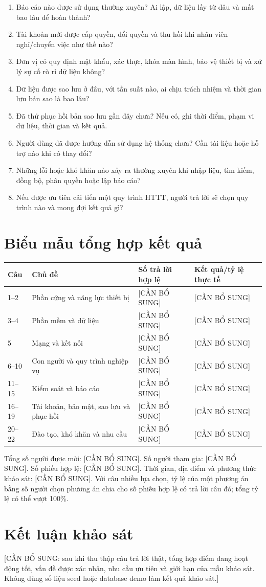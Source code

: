 \begin{enumerate}
\item Báo cáo nào được sử dụng thường xuyên? Ai lập, dữ liệu lấy từ đâu và mất bao lâu để hoàn thành?
\item Tài khoản mới được cấp quyền, đổi quyền và thu hồi khi nhân viên nghỉ/chuyển việc như thế nào?
\item Đơn vị có quy định mật khẩu, xác thực, khóa màn hình, bảo vệ thiết bị và xử lý sự cố rò rỉ dữ liệu không?
\item Dữ liệu được sao lưu ở đâu, với tần suất nào, ai chịu trách nhiệm và thời gian lưu bản sao là bao lâu?
\item Đã thử phục hồi bản sao lưu gần đây chưa? Nếu có, ghi thời điểm, phạm vi dữ liệu, thời gian và kết quả.
\item Người dùng đã được hướng dẫn sử dụng hệ thống chưa? Cần tài liệu hoặc hỗ trợ nào khi có thay đổi?
\item Những lỗi hoặc khó khăn nào xảy ra thường xuyên khi nhập liệu, tìm kiếm, đồng bộ, phân quyền hoặc lập báo cáo?
\item Nếu được ưu tiên cải tiến một quy trình HTTT, người trả lời sẽ chọn quy trình nào và mong đợi kết quả gì?
\end{enumerate}

\section{Biểu mẫu tổng hợp kết quả}
\begin{longtable}{|p{}|p{}|p{}|p{}|}\hline
\textbf{Câu}&\textbf{Chủ đề}&\textbf{Số trả lời hợp lệ}&\textbf{Kết quả/tỷ lệ thực tế}\\\hline\endhead
1--2&Phần cứng và năng lực thiết bị&[CẦN BỔ SUNG]&[CẦN BỔ SUNG]\\\hline
3--4&Phần mềm và dữ liệu&[CẦN BỔ SUNG]&[CẦN BỔ SUNG]\\\hline
5&Mạng và kết nối&[CẦN BỔ SUNG]&[CẦN BỔ SUNG]\\\hline
6--10&Con người và quy trình nghiệp vụ&[CẦN BỔ SUNG]&[CẦN BỔ SUNG]\\\hline
11--15&Kiểm soát và báo cáo&[CẦN BỔ SUNG]&[CẦN BỔ SUNG]\\\hline
16--19&Tài khoản, bảo mật, sao lưu và phục hồi&[CẦN BỔ SUNG]&[CẦN BỔ SUNG]\\\hline
20--22&Đào tạo, khó khăn và nhu cầu&[CẦN BỔ SUNG]&[CẦN BỔ SUNG]\\\hline
\end{longtable}
Tổng số người được mời: [CẦN BỔ SUNG]. Số người tham gia: [CẦN BỔ SUNG]. Số phiếu hợp lệ: [CẦN BỔ SUNG]. Thời gian, địa điểm và phương thức khảo sát: [CẦN BỔ SUNG]. Với câu nhiều lựa chọn, tỷ lệ của một phương án bằng số người chọn phương án chia cho số phiếu hợp lệ có trả lời câu đó; tổng tỷ lệ có thể vượt 100\%.

\section{Kết luận khảo sát}
[CẦN BỔ SUNG: sau khi thu thập câu trả lời thật, tổng hợp điểm đang hoạt động tốt, vấn đề được xác nhận, nhu cầu ưu tiên và giới hạn của mẫu khảo sát. Không dùng số liệu seed hoặc database demo làm kết quả khảo sát.]
